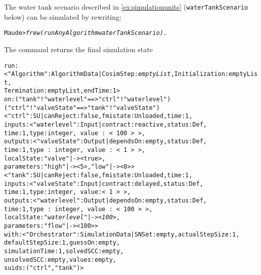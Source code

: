 \begin{example}\label{ex:algoexecution}
The water tank scenario described in \cref{ex:simulationunits}
(\texttt{waterTankScenario} below) can be simulated by rewriting:

\small
\begin{alltt}
Maude> \emph{frew (runAnyAlgorithm waterTankScenario) .}
\end{alltt}
\normalsize

The command returns the final simulation state

\scriptsize
\begin{alltt}
run: < "Algorithm" : AlgorithmData | CosimStep : \emph{emptyList}, Initialization : emptyList,
                                     Termination : emptyList, endTime : 1 > 
on: ("tank" ! "waterlevel" ==> "ctrl" ! "waterlevel") 
    ("ctrl" ! "valveState" ==> "tank" ! "valveState")
    < "ctrl" : SU | canReject : false, fmistate : Unloaded, time : 1,
                    inputs : < "waterlevel" : Input | contract : reactive, status : Def, 
                                                      time : 1, type : integer,\,value\,:\,<\,100\,>\,>,
                    outputs : < "valveState" : Output | dependsOn : empty, status : Def, 
                                                        time : 1, type\,:\,integer,\,value\,:\,<\,1\,>\,>,
                    localState : "valve" |-> < true >,    
                    parameters :"high" |-> < 5 >, "low" |-> < 0 >  > 
    < "tank" : SU | canReject : false, fmistate : Unloaded, time : 1,
                    inputs : < "valveState" : Input | contract : delayed, status : Def,
                                                      time : 1, type : integer,\,value : <\,1\,>\,>,
                    outputs : < "waterlevel" : Output | dependsOn : empty, status : Def,
                                                        time : 1, type\,:\,integer,\,value\,:\,<\,100\,>\,>,
                    localState : \emph{"waterlevel" |-> < 100 >},
                    parameters : "flow" |-> < 100 > > 
with: < "Orchestrator" : SimulationData | SNSet : empty,       actualStepSize : 1, 
                                          defaultStepSize : 1, guessOn : empty,
                                          simulationTime : 1,  solvedSCC : empty, 
                                          unsolvedSCC : empty, values : empty,
                                          suids :("ctrl", "tank") >
\end{alltt}
\normalsize
\end{example}

